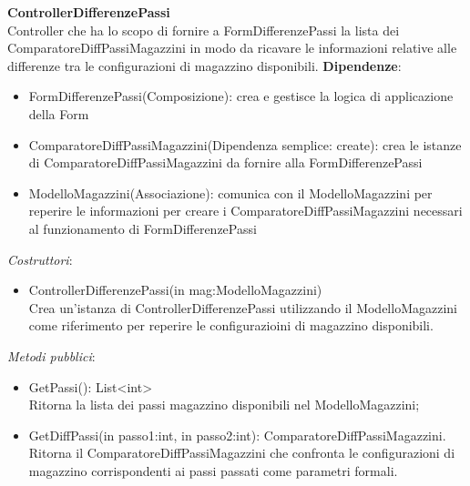 \textbf{ControllerDifferenzePassi}\\
Controller che ha lo scopo di fornire a FormDifferenzePassi la lista dei ComparatoreDiffPassiMagazzini in modo da ricavare le informazioni relative alle differenze tra
le configurazioni di magazzino disponibili.
\textbf{Dipendenze}:
\begin{itemize}
    \item FormDifferenzePassi(Composizione): crea e gestisce la logica di applicazione della Form\\
    \item ComparatoreDiffPassiMagazzini(Dipendenza semplice: create): crea le istanze di ComparatoreDiffPassiMagazzini da fornire alla FormDifferenzePassi\\
    \item ModelloMagazzini(Associazione): comunica con il ModelloMagazzini per reperire le informazioni per creare i ComparatoreDiffPassiMagazzini necessari al funzionamento di FormDifferenzePassi\\
\end{itemize}
\textit{Costruttori}:\\
\begin{itemize}
    \item ControllerDifferenzePassi(in mag:ModelloMagazzini)\\
    Crea un'istanza di ControllerDifferenzePassi utilizzando il ModelloMagazzini come riferimento per reperire le configurazioini di magazzino disponibili.
\end{itemize}
\textit{Metodi pubblici}:\\
\begin{itemize}
    \item GetPassi(): List<int>\\
    Ritorna la lista dei passi magazzino disponibili nel ModelloMagazzini;
    \item GetDiffPassi(in passo1:int, in passo2:int): ComparatoreDiffPassiMagazzini.\\
    Ritorna il ComparatoreDiffPassiMagazzini che confronta le configurazioni di magazzino corrispondenti ai passi passati come parametri formali.
\end{itemize} 
 



